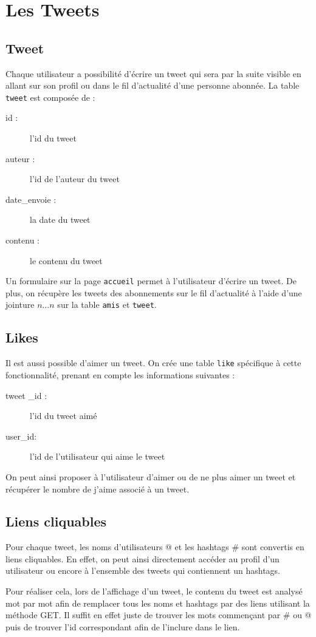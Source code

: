 \documentclass[a4paper, 12pt]{article}
\begin{document}
\section{Les Tweets}	

\subsection{Tweet}
Chaque utilisateur a possibilité d'écrire un tweet qui sera par la suite visible en allant sur son profil ou dans le fil d'actualité d'une personne abonnée. La table \texttt{tweet} est composée de :
\begin{description}
\item[id :] l'id du tweet
\item[auteur :] l’id de l’auteur du tweet
\item[date\_envoie :] la date du tweet
\item[contenu :] le contenu du tweet
\end{description}
Un formulaire sur la page \texttt{accueil} permet à l’utilisateur d’écrire un tweet.
De plus, on récupère les tweets des abonnements sur le fil d’actualité à l’aide d'une  jointure $n…n$ sur la table \texttt{amis} et \texttt{tweet}.

\subsection{Likes}
Il est aussi possible d'aimer un tweet. On crée une table \texttt{like} spécifique à cette fonctionnalité, prenant en compte les informations suivantes :
\begin{description}
\item[tweet \_id :] l’id du tweet aimé
\item[user\_id:] l'id de l'utilisateur qui aime le tweet
\end{description}
On peut ainsi proposer à l'utilisateur d'aimer ou de ne plus aimer un tweet et récupérer le nombre de j'aime associé à un tweet.

\subsection{Liens cliquables}		
Pour chaque tweet, les noms d'utilisateurs @ et les hashtags \# sont convertis en liens cliquables. En effet, on peut ainsi directement accéder au profil d'un utilisateur ou encore à l'ensemble des tweets qui contiennent un hashtags. 

Pour réaliser cela, lors de l'affichage d'un tweet, le contenu du tweet est analysé mot par mot afin de remplacer tous les noms et hashtags par des liens utilisant la méthode GET. Il suffit en effet juste de trouver les mots commençant par \# ou @ puis de trouver l'id correspondant afin de l'inclure dans le lien.
\end{document}

